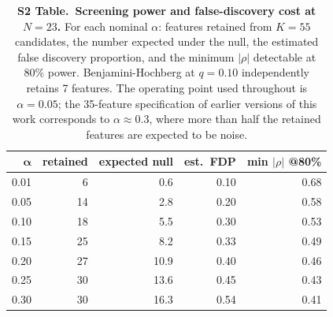 \begin{table}[!ht]
\centering
\caption{\textbf{S2 Table.\ Screening power and false-discovery cost at $N=23$.}
For each nominal $\alpha$: features retained from $K=55$ candidates, the number
expected under the null, the estimated false discovery proportion, and the minimum
$|\rho|$ detectable at 80\% power.  Benjamini-Hochberg at $q=0.10$ independently
retains 7 features.  The operating point used throughout is $\alpha=0.05$; the
35-feature specification of earlier versions of this work corresponds to
$\alpha \approx 0.3$, where more than half the retained features are expected to
be noise.}
\begin{tabular}{rrrrr}
\hline
$\mathbf{\alpha}$ & \textbf{retained} & \textbf{expected null} & \textbf{est.\ FDP} & \textbf{min $|\rho|$ @80\%} \\
\hline
0.01 & 6 & 0.6 & 0.10 & 0.68 \\
0.05 & 14 & 2.8 & 0.20 & 0.58 \\
0.10 & 18 & 5.5 & 0.30 & 0.53 \\
0.15 & 25 & 8.2 & 0.33 & 0.49 \\
0.20 & 27 & 10.9 & 0.40 & 0.46 \\
0.25 & 30 & 13.6 & 0.45 & 0.43 \\
0.30 & 30 & 16.3 & 0.54 & 0.41 \\
\hline
\end{tabular}
\label{tab:s2_power}
\end{table}
